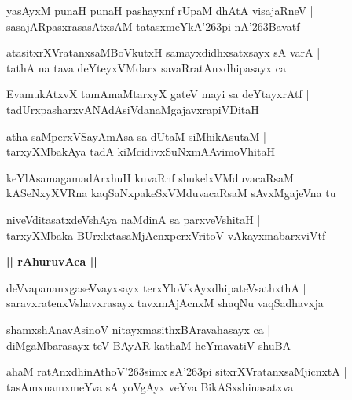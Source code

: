 \documentclass[twoside,12pt,openright]{book}
\def\S{\char'263}
\newcounter{shloka}[chapter]
\def\uvaca#1{\centerline{{\large\textbf{#1}}}}
\begin{document}
\begin{shloka}%
yasAyxM punaH punaH pashayxnf rUpaM dhAtA visajaRneV |\\
sasajARpasxrasasAtxsAM tatasxmeYkA\S pi nA\S Bavatf 
\end{shloka}

\begin{shloka}%
atasitxrXVratanxsaMBoVkutxH samayxdidhxsatxsayx sA varA |\\
tathA na tava deYteyxVMdarx savaRratAnxdhipasayx ca 
\end{shloka}

\begin{shloka}%
EvamukAtxvX tamAmaMtarxyX gateV mayi sa deYtayxrAtf |\\
tadUrxpasharxvANAdAsiVdanaMgajavxrapiVDitaH 
\end{shloka}

\begin{shloka}%
atha saMperxVSayAmAsa sa dUtaM siMhikAsutaM |\\
tarxyXMbakAya tadA kiMcidivxSuNxmAAvimoVhitaH 
\end{shloka}

\begin{shloka}%
keYlAsamagamadArxhuH kuvaRnf shukelxVMduvacaRsaM |\\
kASeNxyXVRna kaqSaNxpakeSxVMduvacaRsaM sAvxMgajeVna tu 
\end{shloka}

\begin{shloka}%
niveVditasatxdeVshAya naMdinA sa parxveVshitaH |\\
tarxyXMbaka BUrxlxtasaMjAcnxperxVritoV vAkayxmabarxviVtf 
\end{shloka}

\uvaca{|| rAhuruvAca ||}

\begin{shloka}%
deVvapananxgaseVvayxsayx terxYloVkAyxdhipateVsathxthA |\\
saravxratenxVshavxrasayx tavxmAjAcnxM shaqNu vaqSadhavxja
\end{shloka}

\begin{shloka}%
shamxshAnavAsinoV nitayxmasithxBAravahasayx ca |\\
diMgaMbarasayx teV BAyAR kathaM heYmavatiV shuBA 
\end{shloka}

\begin{shloka}%
ahaM ratAnxdhinAthoV\S simx  sA\S pi sitxrXVratanxsaMjicnxtA |\\
tasAmxnamxmeYva sA yoVgAyx veYva BikASxshinasatxva 
\end{shloka}
\end{document}
